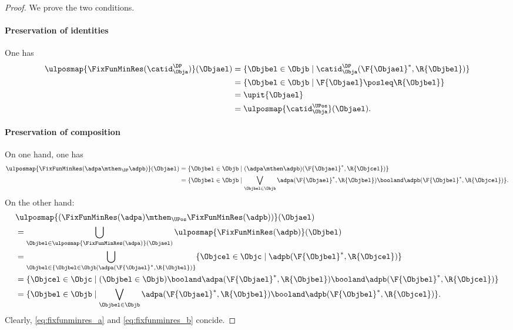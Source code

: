 \begin{proof}
We prove the two conditions.
\paragraph*{Preservation of identities}
One has
\begin{equation*}
\begin{aligned}
\ulposmap{\FixFunMinRes(\catid_{\Obja}^{\DP})}(\Objael)&=\{ \Objbel\in \Objb\mid \catid_{\Obja}^{\DP}(\F{\Objael}^*,\R{\Objbel})\}\\
&=\{ \Objbel \in \Objb\mid \F{\Objael}\posleq\R{\Objbel}\}\\
&=\upit \{ \Objael\}\\
&=\ulposmap{\catid_{\Obja}^{\UPos}}(\Objael).
\end{aligned}
\end{equation*}
\paragraph*{Preservation of composition}
On one hand, one has
\begin{equation}
\label{eq:fixfunminres_a}
\begin{aligned}
\ulposmap{\FixFunMinRes(\adpa\mthen_\DP \adpb)}(\Objael)&=\{ \Objbel\in \Objb\mid (\adpa\mthen \adpb)(\F{\Objael}^*,\R{\Objcel})\}\\
&=\{ \Objbel\in \Objb\mid \bigvee_{\Objbel \in \Objb}\adpa(\F{\Objael}^*,\R{\Objbel})\booland \adpb(\F{\Objbel}^*,\R{\Objcel})\}.
\end{aligned}
\end{equation}
On the other hand:
\begin{equation}
\label{eq:fixfunminres_b}
\begin{aligned}
&\ulposmap{(\FixFunMinRes(\adpa)\mthen_\UPos \FixFunMinRes(\adpb))}(\Objael)\\
&=\bigcup_{\Objbel \in \ulposmap{\FixFunMinRes(\adpa)}(\Objael)}\ulposmap{\FixFunMinRes(\adpb)}(\Objbel)\\
&=\bigcup_{\Objbel \in \{ \Objbel \in \Objb \mid \adpa(\F{\Objael}^*,\R{\Objbel})\}} \{\Objcel \in \Objc \mid \adpb(\F{\Objbel}^*,\R{\Objcel})\}\\
&=\{\Objcel\in \Objc \mid (\Objbel \in \Objb)\booland \adpa(\F{\Objael}^*,\R{\Objbel})\booland \adpb(\F{\Objbel}^*,\R{\Objcel})\}\\
&=\{ \Objbel\in \Objb\mid \bigvee_{\Objbel \in \Objb}\adpa(\F{\Objael}^*,\R{\Objbel})\booland \adpb(\F{\Objbel}^*,\R{\Objcel})\}.
\end{aligned}
\end{equation}
Clearly, \cref{eq:fixfunminres_a} and \cref{eq:fixfunminres_b} concide.
\end{proof}

